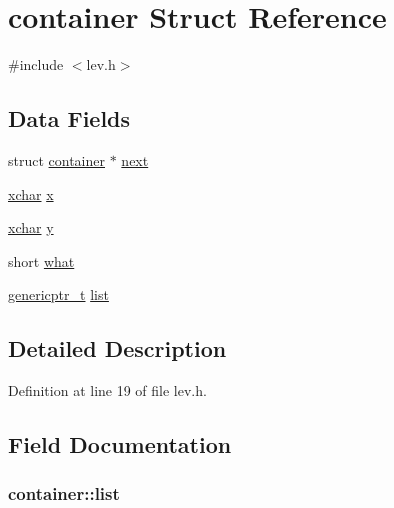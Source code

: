 \hypertarget{structcontainer}{\section{container Struct Reference}
\label{structcontainer}
}


{\ttfamily \#include $<$lev.\+h$>$}

\subsection*{Data Fields}
\begin{DoxyCompactItemize}
\item 
struct \hyperlink{structcontainer}{container} $\ast$ \hyperlink{structcontainer_aa7dd898e9e1df84d3f1e647cbc76f266}{next}
\item 
\hyperlink{global_8h_a2043b7d01ce89f4ee2fa6c345a752d32}{xchar} \hyperlink{structcontainer_a085a03de28c9473865182201317c2a27}{x}
\item 
\hyperlink{global_8h_a2043b7d01ce89f4ee2fa6c345a752d32}{xchar} \hyperlink{structcontainer_a74c8505c048acb675a74441c1c3ccd61}{y}
\item 
short \hyperlink{structcontainer_af31e1bce3abf7ac6d89534c778ed8f26}{what}
\item 
\hyperlink{tradstdc_8h_ad4a7dab7269b4b00e3c7c7d2e66f31cd}{genericptr\+\_\+t} \hyperlink{structcontainer_a0289aa4e01fe8f9377cc4c47acc4f8c8}{list}
\end{DoxyCompactItemize}


\subsection{Detailed Description}


Definition at line 19 of file lev.\+h.



\subsection{Field Documentation}
\hypertarget{structcontainer_a0289aa4e01fe8f9377cc4c47acc4f8c8}{
\subsubsection[{list}]{ container\+::list}}\label{structcontainer_a0289aa4e01fe8f9377cc4c47acc4f8c8}


